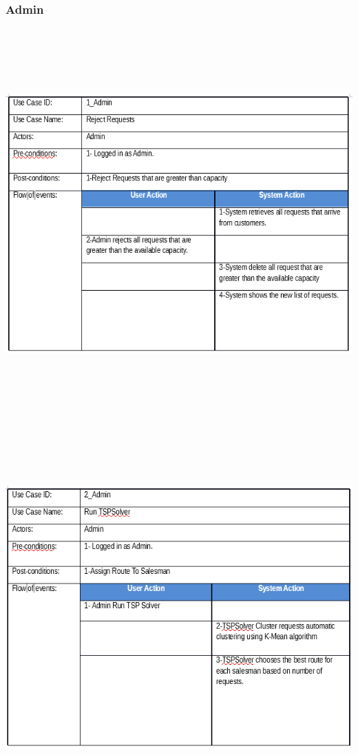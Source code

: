 \documentclass[12pt]{article}
\begin{document}
\subsubsection{ Admin }
\begin{center}
	\includegraphics[width=17cm,height=15cm]{./assets/usecasetable/provider-1.png}\\
	\includegraphics[width=17cm,height=15cm]{./assets/usecasetable/provider-2.png}\\
\end{center}
\end{document}
